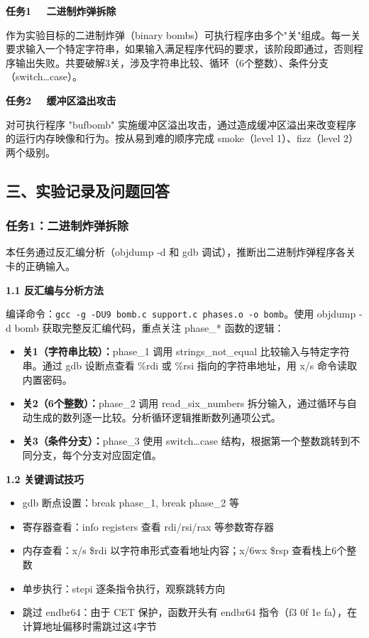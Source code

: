 \textbf{任务1 \ \ 二进制炸弹拆除}

作为实验目标的二进制炸弹（binary bombs）可执行程序由多个"关"组成。每一关要求输入一个特定字符串，如果输入满足程序代码的要求，该阶段即通过，否则程序输出失败。共要破解3关，涉及字符串比较、循环（6个整数）、条件分支（switch\ldots case）。

\textbf{任务2 \ \ 缓冲区溢出攻击}

对可执行程序 "bufbomb" 实施缓冲区溢出攻击，通过造成缓冲区溢出来改变程序的运行内存映像和行为。按从易到难的顺序完成 smoke（level 1）、fizz（level 2）两个级别。

\subsection*{三、实验记录及问题回答}

\subsubsection*{任务1：二进制炸弹拆除}

本任务通过反汇编分析（objdump -d 和 gdb 调试），推断出二进制炸弹程序各关卡的正确输入。

\textbf{1.1 反汇编与分析方法}

编译命令：\texttt{gcc -g -DU9 bomb.c support.c phases.o -o bomb}。使用 objdump -d bomb 获取完整反汇编代码，重点关注 phase\_* 函数的逻辑：
\begin{itemize}[nosep]
    \item \textbf{关1（字符串比较）：}phase\_1 调用 strings\_not\_equal 比较输入与特定字符串。通过 gdb 设断点查看 \%rdi 或 \%rsi 指向的字符串地址，用 x/s 命令读取内置密码。
    \item \textbf{关2（6个整数）：}phase\_2 调用 read\_six\_numbers 拆分输入，通过循环与自动生成的数列逐一比较。分析循环逻辑推断数列通项公式。
    \item \textbf{关3（条件分支）：}phase\_3 使用 switch\ldots case 结构，根据第一个整数跳转到不同分支，每个分支对应固定值。
\end{itemize}

\textbf{1.2 关键调试技巧}
\begin{itemize}[nosep]
    \item gdb 断点设置：break phase\_1, break phase\_2 等
    \item 寄存器查看：info registers 查看 rdi/rsi/rax 等参数寄存器
    \item 内存查看：x/s \$rdi 以字符串形式查看地址内容；x/6wx \$rsp 查看栈上6个整数
    \item 单步执行：stepi 逐条指令执行，观察跳转方向
    \item 跳过 endbr64：由于 CET 保护，函数开头有 endbr64 指令（f3 0f 1e fa），在计算地址偏移时需跳过这4字节
\end{itemize}

